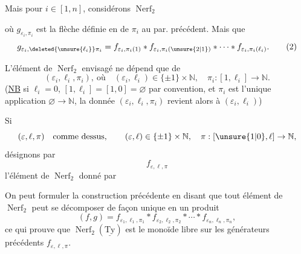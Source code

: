 Mais pour $i\in[1,n]$, considérons    $\operatorname{Nerf}_2$
\diagram{\[
\begin{tikzcd}[ampersand replacement=\&,column sep=normal]
\Delta_{\varepsilon_i}\arrow[r,"{f_{\varepsilon_i,\unsure{\ell_i|c_i}}}"] \&
\Delta_{\varepsilon_i}^{\ell_i}\arrow[r,"{g_{\unsure{\varepsilon_i|\deleted{g}},\pi_i}}"] \&
\underbrace{\Delta_{\varepsilon_i}^{\pi_i(1)}\Delta_{\varepsilon_i}^{\pi_i(\unsure{1|2})}\cdots
\Delta_{\varepsilon_i}^{\pi_i(\ell_i)}}_{\Delta_{\varepsilon_i}^{\sum_j\pi_i(j)\,\overset{\mathrm{déf}}{=}\operatorname{long}(\pi_i)}}
\end{tikzcd}
\tag*{(1)}
\]}


où $g_{\varepsilon_i,\pi_i}$ est la flèche définie en  de $\pi_i$ au par. précédent. Mais  que
\[
g_{\varepsilon_i,\deleted{\unsure{\ell_i}}\pi_i}
=f_{\varepsilon_i,\pi_i(1)}*f_{\varepsilon_i,\pi_i(\unsure{2|1})}*
\cdots*f_{\varepsilon_i,\pi_i(\ell_i)}.
\tag*{(2)}
\]

L'élément de $\operatorname{Nerf}_2$ envisagé ne dépend que de
\[
(\varepsilon_i,\ell_i,\pi_i),\ \text{où}\quad
(\varepsilon_i,\ell_i)\in\{\pm1\}\times\mathbb N,\quad
\pi_i:[1,\ell_i]\longrightarrow\mathbb N.
\]
(\uline{NB} si $\ell_i=0$, $[1,\ell_i]=[1,0]=\varnothing$ par convention, et $\pi_i$ est l'unique application $\varnothing\to\mathbb N$,  la donnée $(\varepsilon_i,\ell_i,\pi_i)$ revient alors à $(\varepsilon_i,\ell_i)$)

Si
\[
(\varepsilon,\ell,\pi)\quad\text{comme dessus},\qquad
(\varepsilon,\ell)\in\{\pm1\}\times\mathbb N,\quad\pi:[\unsure{1|0},\ell]\to\mathbb N,
\]
désignons par
\[
f_{\varepsilon,\ell,\pi}
\]
l'élément de $\operatorname{Nerf}_2$ donné par

On peut  formuler la construction précédente en disant que tout élément de $\operatorname{Nerf}_2$ peut se décomposer de façon unique en un produit \unsure{*}
\[
(f,g)=f_{\varepsilon_1,\ell_1,\pi_1}*f_{\varepsilon_2,\ell_2,\pi_2}*
\cdots*f_{\varepsilon_n,\ell_n,\pi_n},
\]
ce qui prouve que $\operatorname{Nerf}_2(\underline{\mathrm{Ty}})$ est le monoïde libre sur les générateurs précédents $f_{\varepsilon,\ell,\pi}$.


